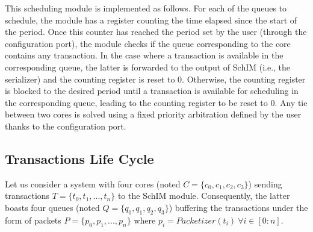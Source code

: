             This scheduling module is implemented as follows. For each of the queues to schedule, the module has a register counting the time elapsed since the start of the period. Once this counter has reached the period set by the user (through the configuration port), the module checks if the queue corresponding to the core contains any transaction. In the case where a transaction is available in the corresponding queue, the latter is forwarded to the output of SchIM (i.e., the serializer) and the counting register is reset to 0. Otherwise, the counting register is blocked to the desired period until a transaction is available for scheduling in the corresponding queue, leading to the counting register to be reset to 0. Any tie between two cores is solved using a fixed priority arbitration defined by the user thanks to the configuration port. 

    \subsection{Transactions Life Cycle}
        \label{subsec:transaction-life-cycle}
        Let us consider a system with four cores (noted $C = \{c_{0}, c_{1}, c_{2}, c_{3}\}$) sending transactions $T = \{t_{0}, t_{1}, ..., t_{n}\}$ to the SchIM module.
        Consequently, the latter boasts four queues (noted $Q = \{q_{0}, q_{1}, q_{2}, q_{3}\}$) buffering the transactions under the form of packets $P = \{p_{0}, p_{1}, ..., p_{n}\}$ where $p_{i} = Packetizer(t_{i})~\forall i \in [0 : n]$.

